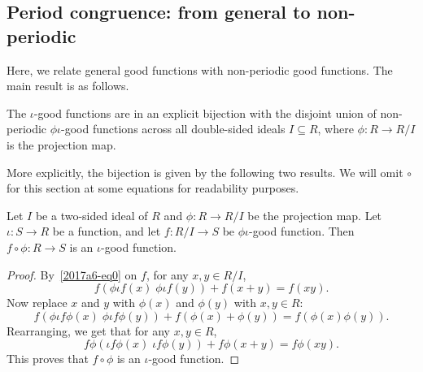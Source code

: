 \subsection*{Period congruence: from general to non-periodic}

Here, we relate general good functions with non-periodic good functions.
The main result is as follows.

\begin{theorem}
The $\iota$-good functions are in an explicit bijection with the disjoint union of non-periodic $\phi \iota$-good functions across all double-sided ideals $I \subseteq R$, where $\phi : R \to R/I$ is the projection map.
\end{theorem}

More explicitly, the bijection is given by the following two results.
We will omit $\circ$ for this section at some equations for readability purposes.

\begin{theorem}
Let $I$ be a two-sided ideal of $R$ and $\phi : R \to R/I$ be the projection map.
Let $\iota : S \to R$ be a function, and let $f : R/I \to S$ be $\phi \iota$-good function.
Then $f \circ \phi : R \to S$ is an $\iota$-good function.
\end{theorem}
\begin{proof}
By~\eqref{2017a6-eq0} on $f$, for any $x, y \in R/I$,
\[ f(\phi \iota f(x) \; \phi \iota f(y)) + f(x + y) = f(xy). \]
Now replace $x$ and $y$ with $\phi(x)$ and $\phi(y)$ with $x, y \in R$:
\[ f(\phi \iota f \phi(x) \; \phi \iota f \phi(y)) + f(\phi(x) + \phi(y)) = f(\phi(x) \phi(y)). \]
Rearranging, we get that for any $x, y \in R$,
\[ f \phi(\iota f \phi(x) \; \iota f \phi(y)) + f \phi(x + y) = f \phi(xy). \]
This proves that $f \circ \phi$ is an $\iota$-good function.
\end{proof}

